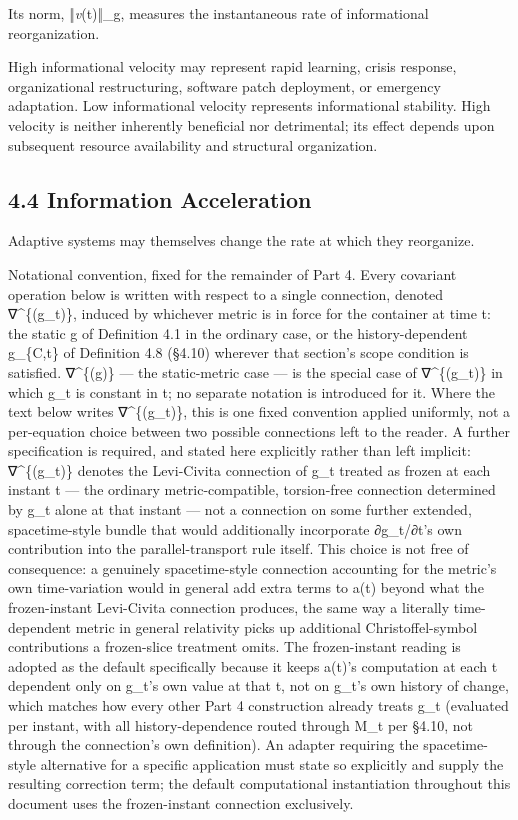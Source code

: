 \documentclass[
]{article}
\begin{document}
Its norm, ‖\emph{v}(t)‖\_g, measures the instantaneous rate of
informational reorganization.

High informational velocity may represent rapid learning, crisis
response, organizational restructuring, software patch deployment, or
emergency adaptation. Low informational velocity represents
informational stability. High velocity is neither inherently beneficial
nor detrimental; its effect depends upon subsequent resource
availability and structural organization.

\hypertarget{information-acceleration}{%
\subsection{4.4 Information
Acceleration}\label{information-acceleration}}

Adaptive systems may themselves change the rate at which they
reorganize.

Notational convention, fixed for the remainder of Part 4. Every
covariant operation below is written with respect to a single
connection, denoted ∇\^{}\{(g\_t)\}, induced by whichever metric is in
force for the container at time t: the static g of Definition 4.1 in the
ordinary case, or the history-dependent g\_\{C,t\} of Definition 4.8
(§4.10) wherever that section's scope condition is satisfied.
∇\^{}\{(g)\} --- the static-metric case --- is the special case of
∇\^{}\{(g\_t)\} in which g\_t is constant in t; no separate notation is
introduced for it. Where the text below writes ∇\^{}\{(g\_t)\}, this is
one fixed convention applied uniformly, not a per-equation choice
between two possible connections left to the reader. A further
specification is required, and stated here explicitly rather than left
implicit: ∇\^{}\{(g\_t)\} denotes the Levi-Civita connection of g\_t
treated as frozen at each instant t --- the ordinary metric-compatible,
torsion-free connection determined by g\_t alone at that instant --- not
a connection on some further extended, spacetime-style bundle that would
additionally incorporate ∂g\_t/∂t's own contribution into the
parallel-transport rule itself. This choice is not free of consequence:
a genuinely spacetime-style connection accounting for the metric's own
time-variation would in general add extra terms to a(t) beyond what the
frozen-instant Levi-Civita connection produces, the same way a literally
time-dependent metric in general relativity picks up additional
Christoffel-symbol contributions a frozen-slice treatment omits. The
frozen-instant reading is adopted as the default specifically because it
keeps a(t)'s computation at each t dependent only on g\_t's own value at
that t, not on g\_t's own history of change, which matches how every
other Part 4 construction already treats g\_t (evaluated per instant,
with all history-dependence routed through M\_t per §4.10, not through
the connection's own definition). An adapter requiring the
spacetime-style alternative for a specific application must state so
explicitly and supply the resulting correction term; the default
computational instantiation throughout this document uses the
frozen-instant connection exclusively.
\end{document}
